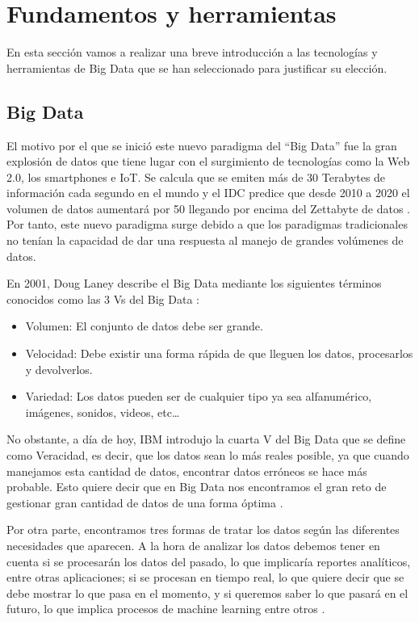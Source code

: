 \section{Fundamentos y herramientas\label{FunAndTools}}

En esta sección vamos a realizar una breve introducción a las
tecnologías y herramientas de Big Data que se han seleccionado para
justificar su elección.

\subsection{Big Data\label{WhatIsBigD}}

El motivo por el que se inició este nuevo paradigma del “Big Data” fue
la gran explosión de datos que tiene lugar con el surgimiento
de tecnologías como la Web 2.0, los smartphones e IoT. Se calcula que
se emiten más de 30 Terabytes de información cada segundo en el mundo
\cite{BD-2} y el IDC predice que desde 2010 a 2020 el volumen de datos
aumentará por 50 llegando por encima del Zettabyte de datos
\cite{BD-2}. Por tanto, este nuevo paradigma surge debido a que los
paradigmas tradicionales no tenían la capacidad de dar una respuesta
al manejo de grandes volúmenes de datos.

En 2001, Doug Laney describe el Big Data mediante los siguientes términos conocidos como las 3 Vs del Big Data \cite{BD-4}:

\begin{itemize}
\item Volumen: El conjunto de datos debe ser grande.
\item Velocidad: Debe existir una forma rápida de que lleguen los datos, procesarlos y devolverlos.
\item Variedad: Los datos pueden ser de cualquier tipo ya sea alfanumérico, imágenes, sonidos, videos, etc…
\end{itemize}

No obstante, a día de hoy, IBM introdujo la cuarta V del Big Data que se define como Veracidad, es decir, que los datos sean lo más reales posible, ya que cuando manejamos esta cantidad de datos, encontrar datos erróneos se hace más probable. Esto quiere decir que en Big Data nos encontramos el gran reto de gestionar gran cantidad de datos de una forma óptima \cite{BD-5}.\par

Por otra parte, encontramos tres formas de tratar los datos según las diferentes necesidades que aparecen. A la hora de analizar los datos debemos tener en cuenta si se procesarán los datos del pasado, lo que implicaría reportes analíticos, entre otras aplicaciones; si se procesan en tiempo real, lo que quiere decir que se debe mostrar lo que pasa en el momento, y si queremos saber lo que pasará en el futuro, lo que implica procesos de machine learning entre otros \cite{BD-3}.\par

